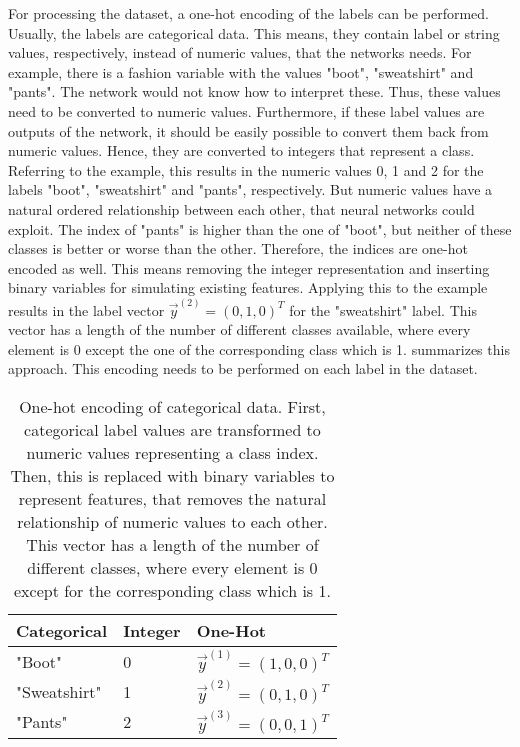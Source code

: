 For processing the dataset, a one-hot encoding \cite{Harris2012} of the labels can be performed.
Usually, the labels are categorical data.
This means, they contain label or string values, respectively, instead of numeric values, that the networks needs.
For example, there is a fashion variable with the values "boot", "sweatshirt" and "pants".
The network would not know how to interpret these.
Thus, these values need to be converted to numeric values.
Furthermore, if these label values are outputs of the network, it should be easily possible to convert them back from numeric values.
Hence, they are converted to integers that represent a class.
Referring to the example, this results in the numeric values 0, 1 and 2 for the labels "boot", "sweatshirt" and "pants", respectively.
But numeric values have a natural ordered relationship between each other, that neural networks could exploit.
The index of "pants" is higher than the one of "boot", but neither of these classes is better or worse than the other.
Therefore, the indices are one-hot encoded as well.
This means removing the integer representation and inserting binary variables for simulating existing features.
Applying this to the example results in the label vector $\vec{y}^{(2)} = (0, 1, 0)^T$ for the "sweatshirt" label.
This vector has a length of the number of different classes available, where every element is 0 except the one of the corresponding class which is 1.
 summarizes this approach.
This encoding needs to be performed on each label in the dataset.
\begin{table}[]
	\caption[One-Hot Encoding of Categorical Data]{One-hot encoding of categorical data. First, categorical label values are transformed to numeric values representing a class index. Then, this is replaced with binary variables to represent features, that removes the natural relationship of numeric values to each other. This vector has a length of the number of different classes, where every element is 0 except for the corresponding class which is 1.}
	\label{tab:one-hot-encoding}
	\centering
	\begin{tabular}{l|l|l}
		Categorical   & Integer & One-Hot                   \\ \hline
		"Boot"       & 0       & $\vec{y}^{(1)} = (1, 0, 0)^T$ \\
		"Sweatshirt" & 1       & $\vec{y}^{(2)} = (0, 1, 0)^T$  \\
		"Pants"      & 2       & $\vec{y}^{(3)} = (0, 0, 1)^T$
	\end{tabular}
\end{table}